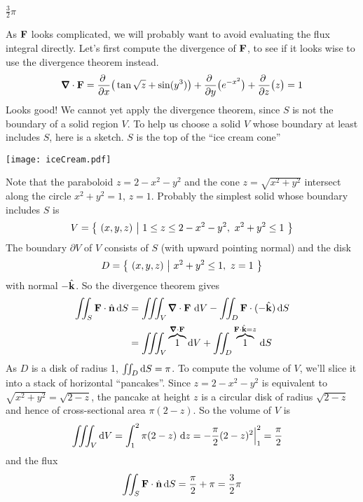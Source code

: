 \begin{answer} 
$\frac{3}{2}\pi$
\end{answer}

\begin{solution} 
As $\mathbf{F}$ looks complicated, we will probably want to avoid evaluating
the flux integral directly. Let's first compute the divergence of $\mathbf{F}$,
to see if it looks wise to use the divergence theorem instead.
\begin{align*}
\vnabla\cdot\vF = 
   \pdiff{}{x}\big(\tan \sqrt{z} + \sin(y^3)\big)
   +\pdiff{}{y}\big(e^{-x^2}\big)
   +\pdiff{}{z}\big(z\big)
=1
\end{align*}
Looks good! We cannot yet apply the divergence theorem, since $S$ is
not the boundary of a solid region $V$. To help us choose a solid 
$V$ whose boundary at least includes $S$, here is a sketch. $S$ is the
top of the ``ice cream cone''

\begin{center}
       \texttt{[image: iceCream.pdf]}
\end{center}
Note that the paraboloid $z = 2 - x^2 - y^2$ and the cone
$z = \sqrt{x^2+y^2}$ intersect along the circle $x^2+y^2=1$, $z=1$.
Probably the simplest solid whose boundary includes $S$ is
\begin{equation*}
V=\Set{(x,y,z)}{1\le z\le 2-x^2-y^2,\ x^2+y^2\le 1}
\end{equation*}
The boundary $\partial V$ of $V$ consists of $S$ (with upward pointing normal)
and the disk
\begin{equation*}
D = \big\{ \ (x,y,z)\ \big|\ x^2+y^2\le 1,\ z=1\ \big\}
\end{equation*}
with normal $-\hat{\mathbf{k}}$. So the divergence theorem gives
\begin{align*}
\dblInt_S \vF \cdot\hn\,\dee{S}
&=\tripInt_V \vnabla\cdot\vF\ \dee{V} 
      -\dblInt_D \vF \cdot(-\hk)\,\dee{S} \\
&=\tripInt_V  \overbrace{1}^{\vnabla\cdot\vF}\dee{V} 
      +\dblInt_D \overbrace{1}^{\vF \cdot \hk = z}\,\dee{S} 
\end{align*}
As $D$ is a disk of radius 1, $\iint_D \mathrm{d}S=\pi$. To compute the volume of
$V$, we'll slice it into a stack of horizontal ``pancakes''. Since
$z=2-x^2-y^2$ is equivalent to $\sqrt{x^2+y^2}=\sqrt{2-z}$, the pancake at height $z$
is a circular disk of radius $\sqrt{2-z}$ and hence of cross-sectional area
$\pi(2-z)$. So the volume of $V$ is
\begin{align*}
\iiint_V  \mathrm{d}V
&=\int_1^2 \pi(2-z) \ \mathrm{d}z
= -\frac{\pi}{2}(2-z)^2\Big|_1^2
=\frac{\pi}{2}
\end{align*}
and the flux
\begin{align*}
\iint_S \mathbf{F} \cdot\hat{\mathbf{n}}\,\mathrm{d}S
=\frac{\pi}{2} +\pi =\frac{3}{2}\pi
\end{align*}

\end{solution}

